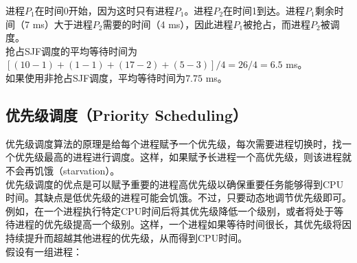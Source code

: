 进程$ P_1 $在时间0开始，因为这时只有进程$ P_1 $。进程$ P_2 $在时间1到达。进程$ P_1 $剩余时间（7 ms）大于进程$ P_2 $需要的时间（4 ms），因此进程$ P_1 $被抢占，而进程$ P_2 $被调度。\\

抢占SJF调度的平均等待时间为$ [(10-1) + (1-1) + (17-2) + (5-3)] / 4 = 26 / 4 = 6.5$ ms。\\

如果使用非抢占SJF调度，平均等待时间为$ 7.75 $ ms。\\

\subsection{优先级调度（Priority Scheduling）}

优先级调度算法的原理是给每个进程赋予一个优先级，每次需要进程切换时，找一个优先级最高的进程进行调度。这样，如果赋予长进程一个高优先级，则该进程就不会再饥饿（starvation）。\\

优先级调度的优点是可以赋予重要的进程高优先级以确保重要任务能够得到CPU时间。其缺点是低优先级的进程可能会饥饿。不过，只要动态地调节优先级即可。例如，在一个进程执行特定CPU时间后将其优先级降低一个级别，或者将处于等待进程的优先级提高一个级别。这样，一个进程如果等待时间很长，其优先级将因持续提升而超越其他进程的优先级，从而得到CPU时间。\\

假设有一组进程：

\begin{table}[H]
    \centering
\end{table}

